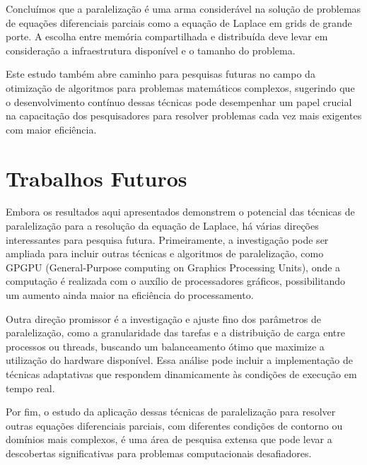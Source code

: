 \documentclass[conference]{IEEEtran}
\begin{document}
Concluímos que a paralelização é uma arma considerável na solução de problemas de equações diferenciais parciais como a equação de Laplace em grids de grande porte. A escolha entre memória compartilhada e distribuída deve levar em consideração a infraestrutura disponível e o tamanho do problema.

Este estudo também abre caminho para pesquisas futuras no campo da otimização de algoritmos para problemas matemáticos complexos, sugerindo que o desenvolvimento contínuo dessas técnicas pode desempenhar um papel crucial na capacitação dos pesquisadores para resolver problemas cada vez mais exigentes com maior eficiência.

\section{Trabalhos Futuros}

Embora os resultados aqui apresentados demonstrem o potencial das técnicas de paralelização para a resolução da equação de Laplace, há várias direções interessantes para pesquisa futura. Primeiramente, a investigação pode ser ampliada para incluir outras técnicas e algoritmos de paralelização, como GPGPU (General-Purpose computing on Graphics Processing Units), onde a computação é realizada com o auxílio de processadores gráficos, possibilitando um aumento ainda maior na eficiência do processamento.

Outra direção promissor é a investigação e ajuste fino dos parâmetros de paralelização, como a granularidade das tarefas e a distribuição de carga entre processos ou threads, buscando um balanceamento ótimo que maximize a utilização do hardware disponível. Essa análise pode incluir a implementação de técnicas adaptativas que respondem dinamicamente às condições de execução em tempo real.

Por fim, o estudo da aplicação dessas técnicas de paralelização para resolver outras equações diferenciais parciais, com diferentes condições de contorno ou domínios mais complexos, é uma área de pesquisa extensa que pode levar a descobertas significativas para problemas computacionais desafiadores.



\end{document}
